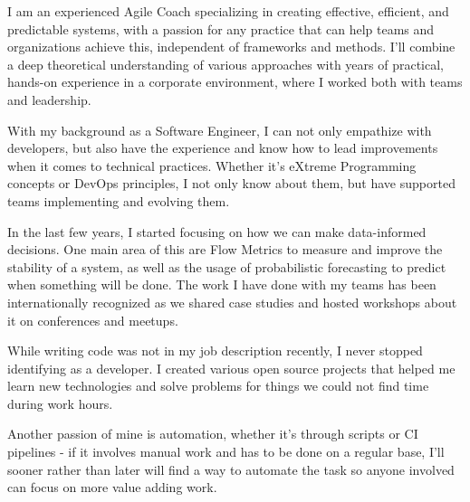 {
}


\begin{cvparagraph}

{}
{
	I am an experienced Agile Coach specializing in creating effective, efficient, and predictable systems, with a passion for any practice that can help teams and organizations achieve this, independent of frameworks and methods. I'll combine a deep theoretical understanding of various approaches with years of practical, hands-on experience in a corporate environment, where I worked both with teams and leadership.	
	
	With my background as a Software Engineer, I can not only empathize with developers, but also have the experience and know how to lead improvements when it comes to technical practices. Whether it's eXtreme Programming concepts or DevOps principles, I not only know about them, but have supported teams implementing and evolving them.
	
	In the last few years, I started focusing on how we can make data-informed decisions. One main area of this are Flow Metrics to measure and improve the stability of a system, as well as the usage of probabilistic forecasting to predict when something will be done. The work I have done with my teams has been internationally recognized as we shared case studies and hosted workshops about it on conferences and meetups.
	
	While writing code was not in my job description recently, I never stopped identifying as a developer. I created various open source projects that helped me learn new technologies and solve problems for things we could not find time during work hours.
	
	Another passion of mine is automation, whether it's through scripts or CI pipelines - if it involves manual work and has to be done on a regular base, I'll sooner rather than later will find a way to automate the task so anyone involved can focus on more value adding work.
}
\end{cvparagraph}
